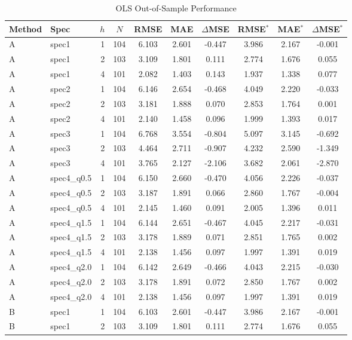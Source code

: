 \begin{table}[htbp]
\centering
\caption{OLS Out-of-Sample Performance}
\label{tab:ols_oos}
\footnotesize
\begin{tabular}{llrccccccc}
\toprule
Method & Spec & $h$ & $N$ & RMSE & MAE & $\Delta$MSE & RMSE$^*$ & MAE$^*$ & $\Delta$MSE$^*$ \\
\midrule
  A & spec1 & 1 & 104 & 6.103 & 2.601 & -0.447 & 3.986 & 2.167 & -0.001 \\
  A & spec1 & 2 & 103 & 3.109 & 1.801 & 0.111 & 2.774 & 1.676 & 0.055 \\
  A & spec1 & 4 & 101 & 2.082 & 1.403 & 0.143 & 1.937 & 1.338 & 0.077 \\
  A & spec2 & 1 & 104 & 6.146 & 2.654 & -0.468 & 4.049 & 2.220 & -0.033 \\
  A & spec2 & 2 & 103 & 3.181 & 1.888 & 0.070 & 2.853 & 1.764 & 0.001 \\
  A & spec2 & 4 & 101 & 2.140 & 1.458 & 0.096 & 1.999 & 1.393 & 0.017 \\
  A & spec3 & 1 & 104 & 6.768 & 3.554 & -0.804 & 5.097 & 3.145 & -0.692 \\
  A & spec3 & 2 & 103 & 4.464 & 2.711 & -0.907 & 4.232 & 2.590 & -1.349 \\
  A & spec3 & 4 & 101 & 3.765 & 2.127 & -2.106 & 3.682 & 2.061 & -2.870 \\
  A & spec4_q0.5 & 1 & 104 & 6.150 & 2.660 & -0.470 & 4.056 & 2.226 & -0.037 \\
  A & spec4_q0.5 & 2 & 103 & 3.187 & 1.891 & 0.066 & 2.860 & 1.767 & -0.004 \\
  A & spec4_q0.5 & 4 & 101 & 2.145 & 1.460 & 0.091 & 2.005 & 1.396 & 0.011 \\
  A & spec4_q1.5 & 1 & 104 & 6.144 & 2.651 & -0.467 & 4.045 & 2.217 & -0.031 \\
  A & spec4_q1.5 & 2 & 103 & 3.178 & 1.889 & 0.071 & 2.851 & 1.765 & 0.002 \\
  A & spec4_q1.5 & 4 & 101 & 2.138 & 1.456 & 0.097 & 1.997 & 1.391 & 0.019 \\
  A & spec4_q2.0 & 1 & 104 & 6.142 & 2.649 & -0.466 & 4.043 & 2.215 & -0.030 \\
  A & spec4_q2.0 & 2 & 103 & 3.178 & 1.891 & 0.072 & 2.850 & 1.767 & 0.002 \\
  A & spec4_q2.0 & 4 & 101 & 2.138 & 1.456 & 0.097 & 1.997 & 1.391 & 0.019 \\
  B & spec1 & 1 & 104 & 6.103 & 2.601 & -0.447 & 3.986 & 2.167 & -0.001 \\
  B & spec1 & 2 & 103 & 3.109 & 1.801 & 0.111 & 2.774 & 1.676 & 0.055 \\

\end{tabular}
\end{table}
